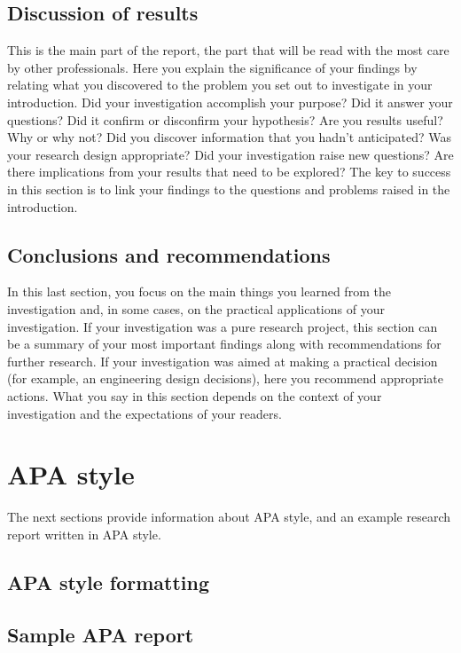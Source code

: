 \subsection{Discussion of results} 
This is the main part of the report, the part that will be read with the most care by other professionals. Here you explain the significance of your findings by relating what you discovered to the problem you set out to investigate in your introduction. Did your investigation accomplish your purpose? Did it answer your questions? Did it confirm or disconfirm your hypothesis? Are you results useful? Why or why not? Did you discover information that you hadn’t anticipated? Was your research design appropriate? Did your investigation raise new questions? Are there implications from your results that need to be explored? The key to success in this section is to link your findings to the questions and problems raised in the introduction.

\subsection{Conclusions and recommendations} 
In this last section, you focus on the main things you learned from the investigation and, in some cases, on the practical applications of your investigation. If your investigation was a pure research project, this section can be a summary of your most important findings along with recommendations for further research. If your investigation was aimed at making a practical decision (for example, an engineering design decisions), here you recommend appropriate actions. What you say in this section depends on the context of your investigation and the expectations of your readers.

\section{APA style}

The next sections provide information about APA style, and an example research report written in APA style.

\subsection{APA style formatting}



\subsection{Sample APA report}



